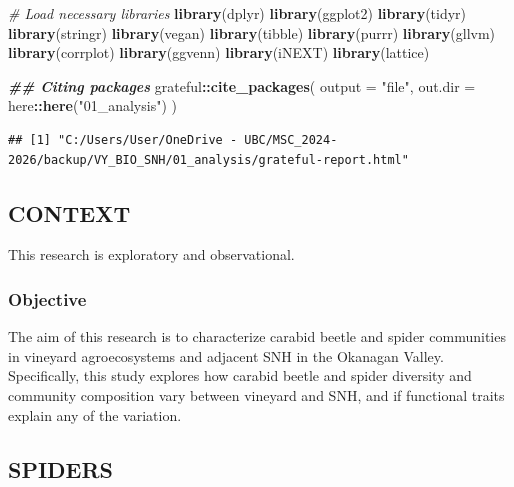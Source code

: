 \documentclass[
]{article}
\newenvironment{Shaded}{\begin{snugshade}}{\end{snugshade}}
\newcommand{\AttributeTok}[1]{\textcolor[rgb]{0.13,0.29,0.53}{#1}}
\newcommand{\CommentTok}[1]{\textcolor[rgb]{0.56,0.35,0.01}{\textit{#1}}}
\newcommand{\DocumentationTok}[1]{\textcolor[rgb]{0.56,0.35,0.01}{\textbf{\textit{#1}}}}
\newcommand{\FunctionTok}[1]{\textcolor[rgb]{0.13,0.29,0.53}{\textbf{#1}}}
\newcommand{\NormalTok}[1]{#1}
\newcommand{\SpecialCharTok}[1]{\textcolor[rgb]{0.81,0.36,0.00}{\textbf{#1}}}
\newcommand{\StringTok}[1]{\textcolor[rgb]{0.31,0.60,0.02}{#1}}
\begin{document}
\begin{Shaded}
\begin{Highlighting}[]
\CommentTok{\# Load necessary libraries}
\FunctionTok{library}\NormalTok{(dplyr)}
\FunctionTok{library}\NormalTok{(ggplot2)}
\FunctionTok{library}\NormalTok{(tidyr)}
\FunctionTok{library}\NormalTok{(stringr)}
\FunctionTok{library}\NormalTok{(vegan)}
\FunctionTok{library}\NormalTok{(tibble)}
\FunctionTok{library}\NormalTok{(purrr)}
\FunctionTok{library}\NormalTok{(gllvm)}
\FunctionTok{library}\NormalTok{(corrplot)}
\FunctionTok{library}\NormalTok{(ggvenn)}
\FunctionTok{library}\NormalTok{(iNEXT)}
\FunctionTok{library}\NormalTok{(lattice)}


\DocumentationTok{\#\# Citing packages}
\NormalTok{grateful}\SpecialCharTok{::}\FunctionTok{cite\_packages}\NormalTok{(}
  \AttributeTok{output =} \StringTok{"file"}\NormalTok{, }
  \AttributeTok{out.dir =}\NormalTok{ here}\SpecialCharTok{::}\FunctionTok{here}\NormalTok{(}\StringTok{"01\_analysis"}\NormalTok{)}
\NormalTok{)}
\end{Highlighting}
\end{Shaded}

\begin{verbatim}
## [1] "C:/Users/User/OneDrive - UBC/MSC_2024-2026/backup/VY_BIO_SNH/01_analysis/grateful-report.html"
\end{verbatim}

\subsection{CONTEXT}\label{context}

This research is exploratory and observational.

\subsubsection{Objective}\label{objective}

The aim of this research is to characterize carabid beetle and spider
communities in vineyard agroecosystems and adjacent SNH in the Okanagan
Valley. Specifically, this study explores how carabid beetle and spider
diversity and community composition vary between vineyard and SNH, and
if functional traits explain any of the variation.

\subsection{SPIDERS}\label{spiders}
\end{document}
